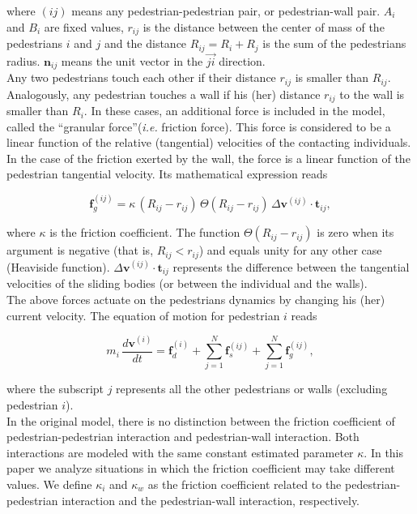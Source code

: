 \documentclass[preprint,12pt]{elsarticle}
\begin{document}
where $(ij)$ means any pedestrian-pedestrian pair, or pedestrian-wall 
pair. $A_i$ and $B_i$ are fixed values, $r_{ij}$ is the distance between  the 
center of mass of the pedestrians $i$ and $j$ and the distance $R_{ij}=R_i+R_j$ 
is the sum of the pedestrians radius. $\mathbf{n}_{ij}$ means the unit vector in 
the $\vec{ji}$ direction.\\

Any two pedestrians touch each other if their distance $r_{ij}$ is smaller than 
$R_{ij}$. Analogously, any pedestrian touches a wall if his (her) distance $r_{ij}$ to the wall is smaller than $R_i$. In these cases, an additional force is included in the model, called the ``granular force''(\textit{i.e.} friction force). This force is considered to be a linear function of the relative (tangential) velocities of the contacting individuals. In the case of the friction exerted by the wall, the force is a linear function of the pedestrian tangential velocity. 
Its mathematical expression reads

\begin{equation}
        \mathbf{f}_g^{(ij)} = 
\kappa\,(R_{ij}-r_{ij})\,\Theta(R_{ij}-r_{ij})\,\Delta
\mathbf{v}^{(ij)}\cdot\mathbf{t}_{ij}, 
        \label{granular}
\end{equation}

where $\kappa$ is the friction coefficient. The function 
$\Theta(R_{ij}-r_{ij})$ is zero when its argument is negative (that is, 
$R_{ij}<r_{ij}$) and equals unity for any other case (Heaviside function). 
$\Delta\mathbf{v}^{(ij)}\cdot\mathbf{t}_{ij}$ represents the difference between 
the tangential velocities of the sliding bodies (or between the individual and 
the walls).\\

The above forces actuate on the pedestrians dynamics by changing his (her) 
current velocity. The equation of motion for pedestrian $i$ reads

\begin{equation}
m_i\,\displaystyle\frac{d\mathbf{v}^{(i)}}{dt}=\mathbf{f}_d^{(i)}
+\displaystyle\sum_{j=1}^{N}\displaystyle\mathbf{f}_s^{(ij)}
+\displaystyle\sum_ {
j=1}^{N}\mathbf{f}_g^{(ij)},\label{eq_mov}
\end{equation}

where the subscript $j$ represents all the other pedestrians or walls
(excluding pedestrian $i$).\\

In the original model, there is no distinction between the friction coefficient of pedestrian-pedestrian interaction and pedestrian-wall interaction. Both interactions are modeled with the same constant estimated parameter $\kappa$. In this paper we analyze situations in which the friction coefficient may take different values. We define $\kappa_i$ and $\kappa_w$ as the friction coefficient related to the pedestrian-pedestrian interaction and the pedestrian-wall interaction, respectively. 
\end{document}
